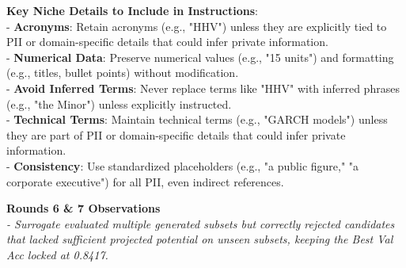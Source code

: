 \documentclass{report}
\begin{document}
\begin{mdframed}[style=promptbox]
\textbf{Key Niche Details to Include in Instructions}: \\
- \textbf{Acronyms}: Retain acronyms (e.g., "HHV") unless they are explicitly tied to PII or domain-specific details that could infer private information. \\
- \textbf{Numerical Data}: Preserve numerical values (e.g., "15 units") and formatting (e.g., titles, bullet points) without modification. \\
- \textbf{Avoid Inferred Terms}: Never replace terms like "HHV" with inferred phrases (e.g., "the Minor") unless explicitly instructed. \\
- \textbf{Technical Terms}: Maintain technical terms (e.g., "GARCH models") unless they are part of PII or domain-specific details that could infer private information. \\
- \textbf{Consistency}: Use standardized placeholders (e.g., "a public figure," "a corporate executive") for all PII, even indirect references.
\end{mdframed}

\vspace{1em}
\noindent \textbf{Rounds 6 \& 7 Observations} \\
\textit{- Surrogate evaluated multiple generated subsets but correctly rejected candidates that lacked sufficient projected potential on unseen subsets, keeping the Best Val Acc locked at 0.8417.}
\end{document}
